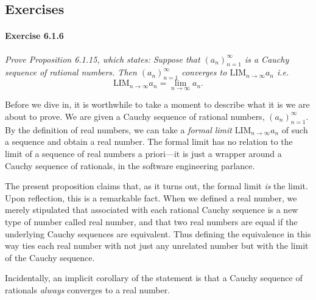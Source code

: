 \documentclass{article}
\newcommand{\ra}{\rightarrow}
\newcommand{\LIM}{{\mathrm{LIM}}}
\begin{document}
\subsection*{Exercises}
\paragraph{Exercise 6.1.6} \textit{Prove Proposition 6.1.15, which states: Suppose that $(a_n)_{n=1}^\infty$ is a Cauchy sequence of rational numbers. Then $(a_n)_{n=1}^\infty$ converges to $\LIM_{n \rightarrow \infty} a_n$ i.e.
\begin{equation}
\LIM_{n \ra \infty} a_n = \lim_{n \ra \infty} a_n.
\end{equation}
}

Before we dive in, it is worthwhile to take a moment to describe what it is we are about to prove. We are given a Cauchy sequence of rational numbers, $(a_n)_{n=1}^\infty$. By the definition of real numbers, we can take a \textit{formal limit} $\LIM_{n \ra \infty} a_n$ of such a sequence and obtain a real number. The formal limit has no relation to the limit of a sequence of real numbers a priori---it is just a wrapper around a Cauchy sequence of rationals, in the software engineering parlance.

The present proposition claims that, as it turns out, the formal limit \textit{is} the limit. Upon reflection, this is a remarkable fact. When we defined a real number, we merely stipulated that associated with each rational Cauchy sequence is a new type of number called real number, and that two real numbers are equal if the underlying Cauchy sequences are equivalent. Thus defining the equivalence in this way ties each real number with not just any unrelated number but with the limit of the Cauchy sequence.

Incidentally, an implicit corollary of the statement is that a Cauchy sequence of rationals \textit{always} converges to a real number.
 
\end{document}
